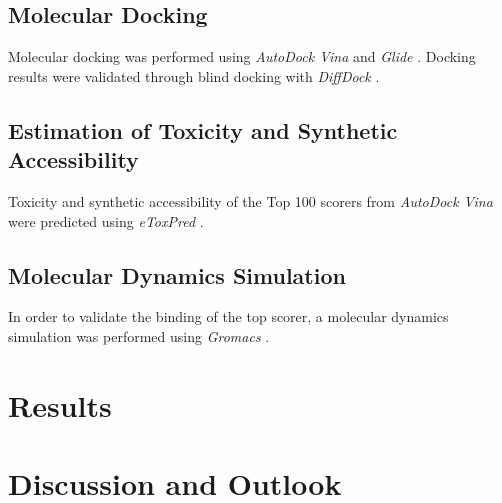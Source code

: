 \documentclass[11pt, letterpaper, titlepage]{article}
\begin{document}
\subsection{Molecular Docking}
Molecular docking was performed using \textit{AutoDock Vina} \cite{Trott.2010} and \textit{Glide} \cite{Friesner2004}. Docking results were validated through blind docking with \textit{DiffDock} \cite{Corso.2022}.

\subsection{Estimation of Toxicity and Synthetic Accessibility}
Toxicity and synthetic accessibility of the Top 100 scorers from \textit{AutoDock Vina} were predicted using \textit{eToxPred} \cite{pu2019toxpred}.

\subsection{Molecular Dynamics Simulation}
In order to validate the binding of the top scorer, a molecular dynamics simulation was performed using \textit{Gromacs} \cite{packageGROMACS}.

\section{Results}


\FloatBarrier

\section{Discussion and Outlook}



\pagebreak
\FloatBarrier
\renewcommand{\bibname}{References}  %
\printbibliography
\end{document}
